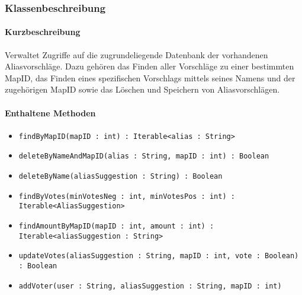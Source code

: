 \subsubsection*{Klassenbeschreibung}%
\paragraph*{Kurzbeschreibung}
Verwaltet Zugriffe auf die zugrundeliegende Datenbank der vorhandenen Aliasvorschläge.
Dazu gehören das Finden aller Vorschläge zu einer bestimmten MapID, das Finden eines spezifischen Vorschlags mittels 
seines Namens und der zugehörigen MapID sowie das Löschen und Speichern von Aliasvorschlägen.
\paragraph*{Enthaltene Methoden}
\begin{itemize}
    \item \texttt{findByMapID(mapID : int) : Iterable<alias : String>}
    \item \texttt{deleteByNameAndMapID(alias : String, mapID : int) : Boolean}
    \item \texttt{deleteByName(aliasSuggestion : String) : Boolean}
    \item \texttt{findByVotes(minVotesNeg : int, minVotesPos : int) : Iterable<AliasSuggestion>}
    \item \texttt{findAmountByMapID(mapID : int, amount : int) : Iterable<aliasSuggestion : String>}
    \item \texttt{updateVotes(aliasSuggestion : String, mapID : int, vote : Boolean) : Boolean}
    \item \texttt{addVoter(user : String, aliasSuggestion : String, mapID : int)}
\end{itemize}
